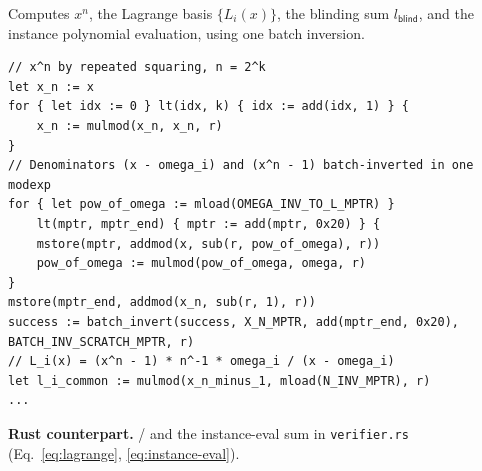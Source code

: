 Computes $x^n$, the Lagrange basis $\{L_i(x)\}$, the blinding sum
$l_{\mathsf{blind}}$, and the instance polynomial evaluation, using one
batch inversion.

\begin{lstlisting}[style=yul]
// x^n by repeated squaring, n = 2^k
let x_n := x
for { let idx := 0 } lt(idx, k) { idx := add(idx, 1) } {
    x_n := mulmod(x_n, x_n, r)
}
// Denominators (x - omega_i) and (x^n - 1) batch-inverted in one modexp
for { let pow_of_omega := mload(OMEGA_INV_TO_L_MPTR) }
    lt(mptr, mptr_end) { mptr := add(mptr, 0x20) } {
    mstore(mptr, addmod(x, sub(r, pow_of_omega), r))
    pow_of_omega := mulmod(pow_of_omega, omega, r)
}
mstore(mptr_end, addmod(x_n, sub(r, 1), r))
success := batch_invert(success, X_N_MPTR, add(mptr_end, 0x20), BATCH_INV_SCRATCH_MPTR, r)
// L_i(x) = (x^n - 1) * n^-1 * omega_i / (x - omega_i)
let l_i_common := mulmod(x_n_minus_1, mload(N_INV_MPTR), r)
...
\end{lstlisting}

\textbf{Rust counterpart.}  /
 and the instance-eval sum in
\texttt{verifier.rs} (Eq.~\eqref{eq:lagrange}, \eqref{eq:instance-eval}).


